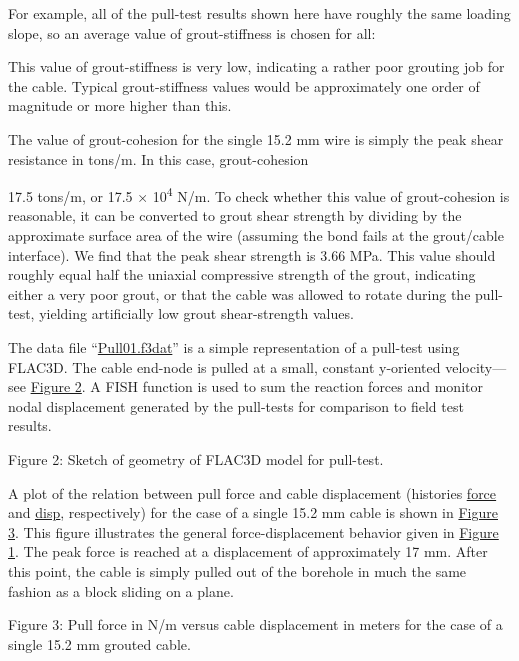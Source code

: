 \documentclass[a4paper, nobind]{templates/ociamthesis}
\begin{document}
For example, all of the pull-test results shown here have roughly the
same
loading slope, so an average value of grout-stiffness
is chosen for all:

This value of grout-stiffness is very low,
indicating a rather poor grouting job for the cable. Typical
grout-stiffness values would be approximately one order of
magnitude or more higher than this.

The value of grout-cohesion for the single 15.2 mm
wire is simply the peak shear resistance in tons/m. In this case,
grout-cohesion

17.5 tons/m, or 17.5 × 10\textsuperscript{4} N/m. To check whether this value of
grout-cohesion is reasonable, it can be converted to grout
shear strength by dividing by the approximate surface area of the wire
(assuming
the bond fails at the grout/cable interface). We find that the peak
shear
strength is 3.66 MPa. This value should roughly equal half the uniaxial
compressive strength of the grout, indicating either a very poor grout,
or that
the cable was allowed to rotate during the pull-test, yielding
artificially low
grout shear-strength values.

The data file ``\protect\hyperlink{pulltest01data}{Pull01.f3dat}'' is a simple
representation
of a pull-test using FLAC3D. The cable end-node is
pulled at a small, constant y-oriented velocity---see \protect\hyperlink{pulltest-geometry}{Figure
2}. A FISH
function is used to sum the reaction forces and monitor nodal
displacement
generated by the pull-tests for comparison to field test results.

Figure 2: Sketch of geometry of FLAC3D model for pull-test.

A plot of the relation between pull force and cable displacement
(histories
\href{../../../../../common/docproject/utilities/types.html\#type:str}{\underline{force}}
and
\href{../../../../../common/docproject/utilities/types.html\#type:str}{\underline{disp}},
respectively) for
the case of a single 15.2 mm cable is shown in \protect\hyperlink{pulltest-cable1}{Figure
3}. This figure illustrates the general
force-displacement behavior given in
\protect\hyperlink{pulltest-fieldresults}{Figure 1}. The peak force is reached at a
displacement of approximately 17 mm. After this point, the cable is
simply
pulled out of the borehole in much the same fashion as a block sliding
on a
plane.

Figure 3: Pull force in N/m versus cable displacement in meters
for the case of a single 15.2 mm grouted cable.
\end{document}
